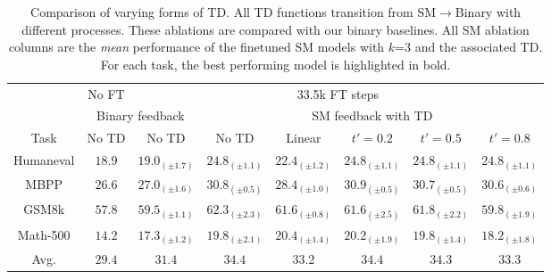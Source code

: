 \begin{table}[h!]
\centering
\setlength{\tabcolsep}{4pt}
\begin{tabular}{cccccccc}
\toprule
     & No FT & \multicolumn{6}{c}{33.5k FT steps}\\\cmidrule(r){2-2}\cmidrule(r){3-8}
    & \multicolumn{2}{c}{Binary feedback} & \multicolumn{5}{c}{SM feedback with TD} \\\cmidrule(r){1-1}\cmidrule(r){2-3}\cmidrule(r){4-8}
Task & No TD & No TD & No TD & Linear  & $t' = 0.2$ & $t' = 0.5$ & $t' = 0.8$ \\\cmidrule(r){1-1}\cmidrule(r){2-3}\cmidrule(r){4-8}
Humaneval & $18.9$& $19.0_{(\pm 1.7)}$& $\mathbf{24.8}_{(\pm 1.1)}$& $22.4_{(\pm 1.2)}$& $\mathbf{24.8}_{(\pm 1.1)}$& $\mathbf{24.8}_{(\pm 1.1)}$& $\mathbf{24.8}_{(\pm 1.1)}$\\
MBPP     &  $26.6$& $27.0_{(\pm 1.6)}$& $30.8_{(\pm 0.5)}$& $28.4_{(\pm 1.0)}$& $\mathbf{30.9}_{(\pm 0.5)}$& $30.7_{(\pm 0.5)}$& $30.6_{(\pm 0.6)}$\\ 
GSM8k    & $57.8$& $59.5_{(\pm 1.1)}$& $\mathbf{62.3}_{(\pm 2.3)}$& $61.6_{(\pm 0.8)}$& $61.6_{(\pm 2.5)}$& $61.8_{(\pm 2.2)}$& $59.8_{(\pm 1.9)}$\\
Math-500  & $14.2$& $17.3_{(\pm 1.2)}$& $19.8_{(\pm 2.1)}$& $\mathbf{20.4}_{(\pm 1.4)}$& $20.2_{(\pm 1.9)}$& $19.8_{(\pm 1.4)}$& $18.2_{(\pm 1.8)}$\\
\midrule
Avg.      & $29.4$& $31.4$&	$\mathbf{34.4}$&	$33.2$&	$\mathbf{34.4}$&	$34.3$& $33.3$\\ \bottomrule
\end{tabular}
\caption{Comparison of varying forms of TD. All TD functions transition from SM$\rightarrow$Binary with different processes. These ablations are compared with our binary baselines. All SM ablation columns are the \textit{mean} performance of the finetuned SM models with $k$=3 and the associated TD. For each task, the best performing model is highlighted in bold.}
\label{tab:time_dependence_early}
\end{table}